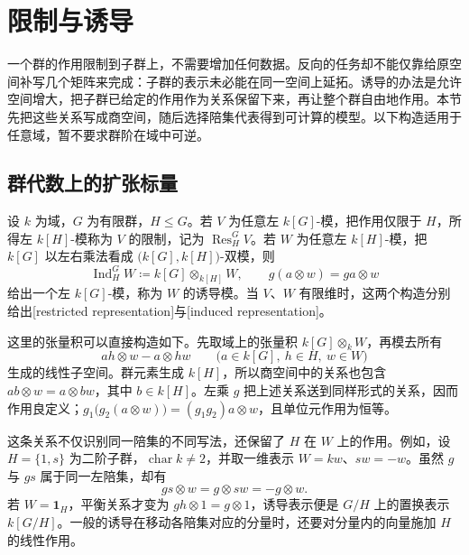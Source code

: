 

\section{限制与诱导}
\label{b5:sec:0301}

一个群的作用限制到子群上，不需要增加任何数据。反向的任务却不能仅靠给原空间补写几个矩阵来完成：子群的表示未必能在同一空间上延拓。诱导的办法是允许空间增大，把子群已给定的作用作为关系保留下来，再让整个群自由地作用。本节先把这些关系写成商空间，随后选择陪集代表得到可计算的模型。以下构造适用于任意域，暂不要求群阶在域中可逆。

\subsection{群代数上的扩张标量}
\label{b5:subsec:0301:01}

\begin{definition}\label{b5:def:restriction-induction}
	设 \(k\) 为域，\(G\) 为有限群，\(H\le G\)。若 \(V\) 为任意左 \(k[G]\)-模，把作用仅限于 \(H\)，所得左 \(k[H]\)-模称为 \(V\) 的限制，记为 \(\operatorname{Res}_H^G V\)。若 \(W\) 为任意左 \(k[H]\)-模，把 \(k[G]\) 以左右乘法看成 \(\bigl(k[G],k[H]\bigr)\)-双模，则
	\[
		\operatorname{Ind}_H^G W\coloneqq k[G]\otimes_{k[H]}W, \qquad g(a\otimes w)=ga\otimes w
	\]
	给出一个左 \(k[G]\)-模，称为 \(W\) 的诱导模。当 \(V\)、\(W\) 有限维时，这两个构造分别给出[restricted representation]与[induced representation]。
\end{definition}

这里的张量积可以直接构造如下。先取域上的张量积 \(k[G]\otimes_k W\)，再模去所有
\[
	ah\otimes w-a\otimes hw \qquad\bigl(a\in k[G],\ h\in H,\ w\in W\bigr)
\]
生成的线性子空间。群元素生成 \(k[H]\)，所以商空间中的关系也包含 \(ab\otimes w=a\otimes bw\)，其中 \(b\in k[H]\)。左乘 \(g\) 把上述关系送到同样形式的关系，因而作用良定义；\(g_1\bigl(g_2(a\otimes w)\bigr)=(g_1g_2)a\otimes w\)，且单位元作用为恒等。

\ProseParagraphBreak
这条关系不仅识别同一陪集的不同写法，还保留了 \(H\) 在 \(W\) 上的作用。例如，设 \(H=\{1,s\}\) 为二阶子群，\(\operatorname{char}k\ne2\)，并取一维表示 \(W=kw\)、\(sw=-w\)。虽然 \(g\) 与 \(gs\) 属于同一左陪集，却有
\[
	gs\otimes w=g\otimes sw=-g\otimes w.
\]
若 \(W=\mathbf1_H\)，平衡关系才变为 \(gh\otimes1=g\otimes1\)，诱导表示便是 \(G/H\) 上的置换表示 \(k[G/H]\)。一般的诱导在移动各陪集对应的分量时，还要对分量内的向量施加 \(H\) 的线性作用。

